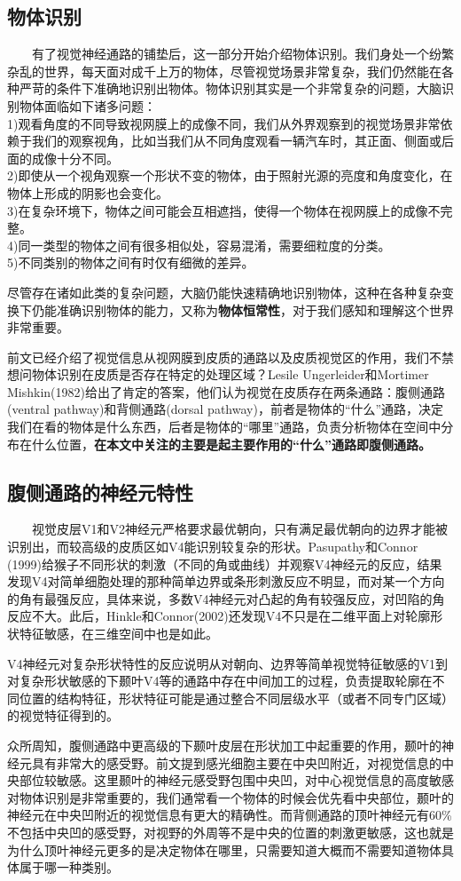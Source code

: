 \documentclass{article}
\begin{document}
\begin{spacing}{1.0}
\section{物体识别}
\ \ \ \ 有了视觉神经通路的铺垫后，这一部分开始介绍物体识别。我们身处一个纷繁杂乱的世界，每天面对成千上万的物体，尽管视觉场景非常复杂，我们仍然能在各种严苛的条件下准确地识别出物体。物体识别其实是一个非常复杂的问题，大脑识别物体面临如下诸多问题：\\
1)观看角度的不同导致视网膜上的成像不同，我们从外界观察到的视觉场景非常依赖于我们的观察视角，比如当我们从不同角度观看一辆汽车时，其正面、侧面或后面的成像十分不同。\\
2)即使从一个视角观察一个形状不变的物体，由于照射光源的亮度和角度变化，在物体上形成的阴影也会变化。\\
3)在复杂环境下，物体之间可能会互相遮挡，使得一个物体在视网膜上的成像不完整。\\
4)同一类型的物体之间有很多相似处，容易混淆，需要细粒度的分类。\\
5)不同类别的物体之间有时仅有细微的差异。\par 
尽管存在诸如此类的复杂问题，大脑仍能快速精确地识别物体，这种在各种复杂变换下仍能准确识别物体的能力，又称为\textbf{物体恒常性}，对于我们感知和理解这个世界非常重要。\par 
	前文已经介绍了视觉信息从视网膜到皮质的通路以及皮质视觉区的作用，我们不禁想问物体识别在皮质是否存在特定的处理区域？Lesile Ungerleider和Mortimer Mishkin(1982)给出了肯定的答案，他们认为视觉在皮质存在两条通路：腹侧通路(ventral pathway)和背侧通路(dorsal pathway)，前者是物体的“什么”通路，决定我们在看的物体是什么东西，后者是物体的“哪里”通路，负责分析物体在空间中分布在什么位置，\textbf{在本文中关注的主要是起主要作用的“什么”通路即腹侧通路。}
\subsection{腹侧通路的神经元特性}
\ \ \ \ 视觉皮层V1和V2神经元严格要求最优朝向，只有满足最优朝向的边界才能被识别出，而较高级的皮质区如V4能识别较复杂的形状。Pasupathy和Connor\\(1999)给猴子不同形状的刺激（不同的角或曲线）并观察V4神经元的反应，结果发现V4对简单细胞处理的那种简单边界或条形刺激反应不明显，而对某一个方向的角有最强反应，具体来说，多数V4神经元对凸起的角有较强反应，对凹陷的角反应不大。此后，Hinkle和Connor(2002)还发现V4不只是在二维平面上对轮廓形状特征敏感，在三维空间中也是如此。\par V4神经元对复杂形状特性的反应说明从对朝向、边界等简单视觉特征敏感的V1到对复杂形状敏感的下颞叶V4等的通路中存在中间加工的过程，负责提取轮廓在不同位置的结构特征，形状特征可能是通过整合不同层级水平（或者不同专门区域）的视觉特征得到的。\cite{lyj} \par 
	众所周知，腹侧通路中更高级的下颞叶皮层在形状加工中起重要的作用，颞叶的神经元具有非常大的感受野。前文提到感光细胞主要在中央凹附近，对视觉信息的中央部位较敏感。这里颞叶的神经元感受野包围中央凹，对中心视觉信息的高度敏感对物体识别是非常重要的，我们通常看一个物体的时候会优先看中央部位，颞叶的神经元在中央凹附近的视觉信息有更大的精确性。而背侧通路的顶叶神经元有60\%不包括中央凹的感受野，对视野的外周等不是中央的位置的刺激更敏感，这也就是为什么顶叶神经元更多的是决定物体在哪里，只需要知道大概而不需要知道物体具体属于哪一种类别。

\end{spacing}
\end{document}
